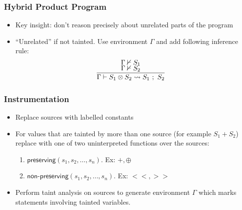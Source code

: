 \documentclass{beamer} %
\theoremstyle{definition} %
\newcommand{\cross}{\otimes{}}
\begin{document}
    \begin{frame}
        \frametitle{Hybrid Product Program}
        
        \begin{itemize}
            \item Key insight: don't reason precisely about unrelated parts of the program
            \item ``Unrelated'' if not tainted. Use environment $\Gamma$ and add following inference rule:
            \[
                \begin{array}{c}
                    \infer[]{\Gamma \vdash S_1 \cross S_2 \leadsto S_1\ ;\ S_2}{
                        \Gamma \nvdash S_1 \\
                        \Gamma \nvdash S_2
                    } \\
                \end{array}
            \]
        \end{itemize}
            
        \end{frame}



\begin{frame}
\frametitle{Instrumentation}
    
\begin{itemize}
    \item Replace sources with labelled constants
    \item For values that are tainted by more than one source (for example $S_1 + S_2$) replace with one of two uninterpreted functions over the sources: \begin{enumerate}
		\item $\textsf{preserving}(s_1, s_2, \ldots, s_n)$. Ex: $+, \oplus$
		\item $\textsf{non-preserving}(s_1, s_2, \ldots, s_n)$. Ex: $<<, >>$
    \end{enumerate}
    \item Perform taint analysis on sources to generate environment $\Gamma$ which marks statements involving tainted variables.
\end{itemize}

\end{frame}
\end{document}
